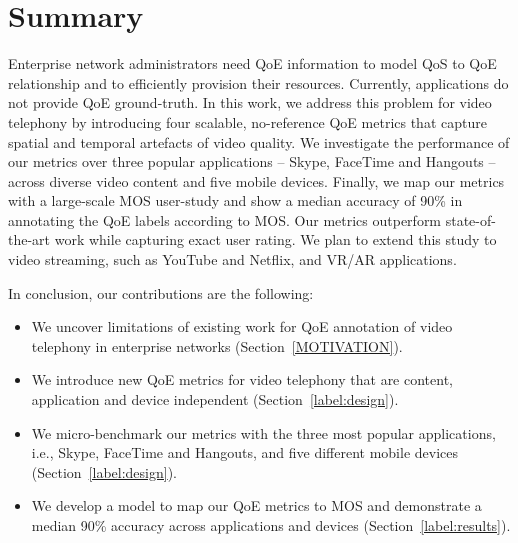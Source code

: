 \section{Summary}
Enterprise network administrators need QoE information to model QoS to QoE relationship and to efficiently provision their resources. Currently, applications do not provide QoE ground-truth. In this work, we address this problem for video telephony by introducing four scalable, no-reference QoE metrics that capture spatial and temporal artefacts of video quality. We investigate the performance of our metrics over three popular applications -- Skype, FaceTime and Hangouts -- across diverse video content and five mobile devices. Finally, we map our metrics with a large-scale MOS user-study and show a median accuracy of 90\% in annotating the QoE labels according to MOS. Our metrics outperform state-of-the-art work while capturing exact user rating. We plan to extend this study to video streaming, such as YouTube and Netflix, and VR/AR applications.

In conclusion, our contributions are the following:
\begin{itemize}[leftmargin=*]
    \item We uncover limitations of existing work for QoE annotation of video telephony in enterprise networks (Section~\ref{MOTIVATION}).
    \item We introduce new QoE metrics for video telephony that are content, application and device independent (Section~\ref{label:design}).
    \item We micro-benchmark our metrics with the three most popular applications, i.e., Skype, FaceTime and Hangouts, and five different mobile devices (Section~\ref{label:design}).
    \item We develop a model to map our QoE metrics to MOS and demonstrate a median 90\% accuracy across applications and devices (Section~\ref{label:results}).
\end{itemize}
